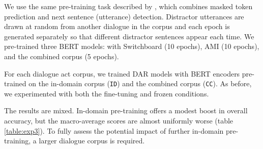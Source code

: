 \documentclass[11pt,a4paper]{article}
\begin{document}
We use the same pre-training task described by \citet{devlinBERTPretrainingDeep2018}, which combines masked token prediction and next sentence (utterance) detection. 
Distractor utterances are drawn at random from another dialogue in the corpus
and each epoch is generated separately so that different distractor sentences appear each time.
We pre-trained three BERT models: with Switchboard (10 epochs), AMI (10 epochs), and the combined corpus (5 epochs).

For each dialogue act corpus, we trained DAR models with BERT encoders pre-trained on the in-domain corpus (\texttt{ID}) and the combined corpus (\texttt{CC}).
As before, we experimented with both the fine-tuning and frozen conditions.

The results are mixed.
In-domain pre-training offers a modest boost in overall accuracy,
but the macro-average scores are almost uniformly worse (table \ref{table:exp3}).
To fully assess the potential impact of further in-domain pre-training, a larger dialogue corpus is required.
\end{document}
